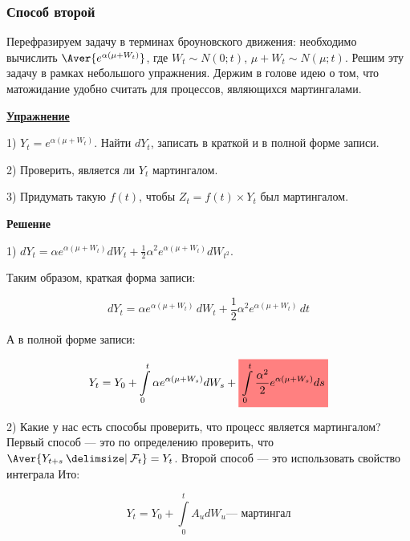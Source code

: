 \documentclass[a4paper]{article}
\newcommand{\highlight}[1]{%
  \colorbox{red!50}{$\displaystyle#1$}}
\providecommand\given{}
\renewcommand\given{  \nonscript\:
  \delimsize\vert
  \nonscript\:
  \mathopen{}
  \allowbreak}
\begin{document}
 \subsubsection{Способ второй}

 Перефразируем задачу в терминах броуновского движения: необходимо вычислить $\Aver{e^{\alpha (\mu + W_{t})}}$, где $W_{t} \sim N(0;t)$, $\mu + W_{t} \sim N(\mu;t)$. Решим эту задачу в рамках небольшого упражнения. Держим в голове идею о том, что матожидание удобно считать для процессов, являющихся мартингалами.
 \vspace{5mm}

 \par {\bf\underline{Упражнение}}

 1) $Y_{t} = e^{\alpha (\mu + W_{t})}$. Найти $dY_{t}$, записать в краткой и в полной форме записи.

 2) Проверить, является ли $Y_{t}$ мартингалом.

 3) Придумать такую $f(t)$, чтобы $Z_{t} = f(t) \times Y_{t}$ был мартингалом.
 \vspace{5mm}

  \par {\bf{Решение}}

 1) $dY_{t} = \alpha e^{\alpha (\mu + W_{t})} dW_{t} + \frac{1}{2} \alpha^{2}e^{\alpha(\mu + W_{t})} dW_{t^{2}}$.

 Таким образом, краткая форма записи:

\begin{equation*}
     dY_t = \alpha e^{\alpha (\mu + W_t)} \, dW_t + \frac{1}{2} \alpha^2 e^{\alpha(\mu + W_t)} \, dt
\end{equation*}

 А в полной форме записи:

  \begin{equation*}
  Y_{t} = Y_{0} + \int\limits_{0}^{t} \alpha e^{\alpha(\mu+W_{s})} dW_{s} + \highlight{\int\limits_{0}^{t} \frac{\alpha^{2}}{2}e^{\alpha(\mu+W_{s})}ds}
  \end{equation*}

  \newpage

  2) Какие у нас есть способы проверить, что процесс является мартингалом? Первый способ — это по определению проверить, что $\Aver{Y_{t+s} \given \mathcal{{F}}_{t}} = Y_{t}$. Второй способ — это использовать свойство интеграла Ито:

    \begin{equation*}
 Y_{t} = Y_{0} + \int\limits_{0}^{t}A_{u}dW_{u} \text{— мартингал}
  \end{equation*}
\end{document}
